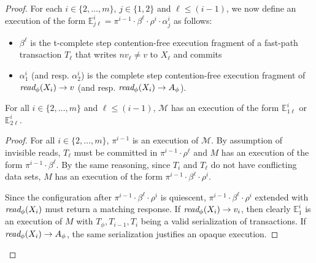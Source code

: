 \begin{proof}
For each $i\in \{2,\ldots, m\}$, $j\in \{1,2\}$ and $\ell \leq (i-1)$, 
we now define an execution of the form  $\mathbb{E}_{j\ell}^{i}=\pi^{i-1}\cdot \beta^{\ell}\cdot \rho^i \cdot \alpha_j^i$
as follows:
%
\begin{itemize}
\item
$\beta^{\ell}$ is the t-complete step contention-free execution fragment of a fast-path transaction $T_{\ell}$
that writes $nv_{\ell}\neq v$ to $X_{\ell}$ and commits
\item
$\alpha_1^i$ (and resp. $\alpha_2^i$) is the complete step contention-free execution fragment of 
$\textit{read}_{\phi}(X_i) \rightarrow v$ (and resp. $\textit{read}_{\phi}(X_i) \rightarrow A_{\phi}$).
\end{itemize}
%
\begin{claim}
\label{cl:ic2}
For all $i\in \{2,\ldots, m\}$ and $\ell \leq (i-1)$, $\mathcal{M}$ has an execution of the form $\mathbb{E}_{1\ell}^{i}$ or 
$\mathbb{E}_{2\ell}^{i}$.
\end{claim}
%
\begin{proof}
%
For all $i \in \{2,\ldots, m\}$, $\pi^{i-1}$
is an execution of $\mathcal{M}$.
By assumption of invisible reads, $T_{{\ell}}$ must be committed in $\pi^{i-1}\cdot \rho^{\ell}$
and $M$ has an execution of the form $\pi^{i-1}\cdot \beta^{\ell}$.
By the same reasoning, since $T_i$ and $T_{\ell}$ do not have conflicting data sets,
$M$ has an execution of the form $\pi^{i-1}\cdot\beta^{\ell}\cdot \rho^i$.

Since the configuration after $\pi^{i-1}\cdot\beta^{\ell}\cdot \rho^i$ is quiescent,
$\pi^{i-1}\cdot\beta^{\ell}\cdot \rho^i$ extended with $\textit{read}_{\phi}(X_i)$
must return a matching response.
If $\textit{read}_{\phi}(X_i) \rightarrow v_i$, then clearly $\mathbb{E}_{1}^{i}$
is an execution of $M$ with $T_{\phi}, T_{i-1}, T_i$ being a valid serialization
of transactions.
If $\textit{read}_{\phi}(X_i) \rightarrow A_{\phi}$, the same serialization
justifies an opaque execution.


\end{proof}
\end{proof}
